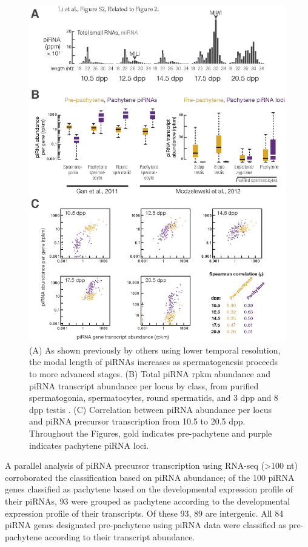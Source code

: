     \begin{figure}[htbp]\tiny %
      \centering 
      \includegraphics{Figures/MolCel/MolCel2013_FigS2.eps}
      \caption[Pre-pachytene piRNAs Persist in Pachytene Spermatocytes]
      {
     	 (A) As shown previously by others using lower temporal resolution, the modal length of piRNAs increases as spermatogenesis proceeds to more advanced stages. (B) Total piRNA rpkm abundance and piRNA transcript abundance per locus by class, from purified spermatogonia, spermatocytes, round spermatids, and 3 dpp and 8 dpp testis \citep{Gan2011, Modzelewski2012}. (C) Correlation between piRNA abundance per locus and piRNA precursor transcription from 10.5 to 20.5 dpp. Throughout the Figures, gold indicates pre-pachytene and purple indicates pachytene piRNA loci.
     	 }
      \label{fig:MolCelS2}
      \end{figure}

    A parallel analysis of piRNA precursor transcription using RNA-seq (>100 nt) corroborated the classification based on piRNA abundance; of the 100 piRNA genes classified as pachytene based on the developmental expression profile of their piRNAs, 93 were grouped as pachytene according to the developmental expression profile of their transcripts. Of these 93, 89 are intergenic. All 84 piRNA genes designated pre-pachytene using piRNA data were classified as pre-pachytene according to their transcript abundance.

